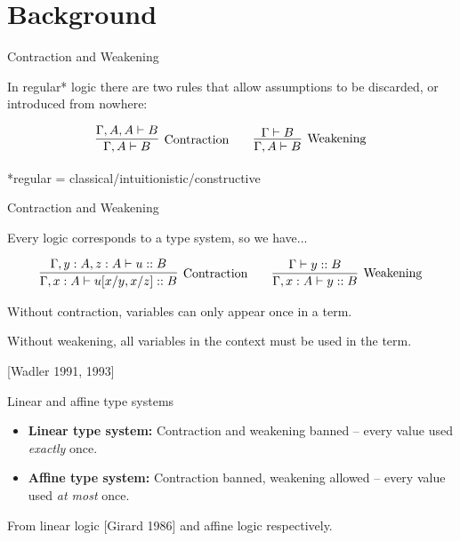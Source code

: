 \documentclass[10pt]{beamer}
\begin{document}
\section{Background}

\begin{frame}{Contraction and Weakening}

In regular* logic there are two rules that allow assumptions to be discarded, or introduced from nowhere:

$$
\infer[\text{Contraction}]{\Gamma, A \vdash B}{
	\Gamma, A, A \vdash B
}
\qquad
\infer[\text{Weakening}]{\Gamma, A \vdash B}{
    \Gamma \vdash B
}
$$

*regular = classical/intuitionistic/constructive

\end{frame}

\begin{frame}{Contraction and Weakening}

Every logic corresponds to a type system, so we have...

\begin{eqnarray*}
\infer[\text{Contraction}]{\Gamma, x : A \vdash u[x/y, x/z] :: B}{
	\Gamma, y : A, z : A \vdash u :: B
}
\qquad
\infer[\text{Weakening}]{\Gamma, x : A \vdash y :: B}{
    \Gamma\vdash y :: B
}
\end{eqnarray*}

Without contraction, variables can only appear once in a term.

Without weakening, all variables in the context must be used in the term.

[Wadler 1991, 1993]

\end{frame}

\begin{frame}{Linear and affine type systems}

\begin{itemize}
\item \textbf{Linear type system:} Contraction and weakening banned -- every value used \textit{exactly} once.
\item \textbf{Affine type system:} Contraction banned, weakening allowed -- every value used \textit{at most} once.
\end{itemize}

From linear logic [Girard 1986] and affine logic respectively.

\end{frame}
\end{document}
